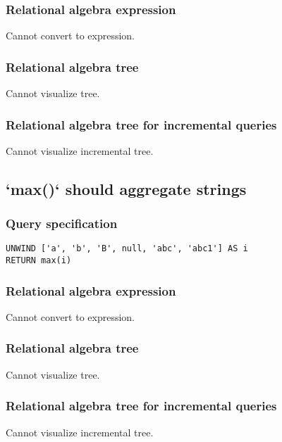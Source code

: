\subsubsection*{Relational algebra expression}

Cannot convert to expression.

\subsubsection*{Relational algebra tree}

Cannot visualize tree.

\subsubsection*{Relational algebra tree for incremental queries}

Cannot visualize incremental tree.

\subsection{`max()` should aggregate strings}

\subsubsection*{Query specification}

\begin{lstlisting}
UNWIND ['a', 'b', 'B', null, 'abc', 'abc1'] AS i
RETURN max(i)
\end{lstlisting}

\subsubsection*{Relational algebra expression}

Cannot convert to expression.

\subsubsection*{Relational algebra tree}

Cannot visualize tree.

\subsubsection*{Relational algebra tree for incremental queries}

Cannot visualize incremental tree.

